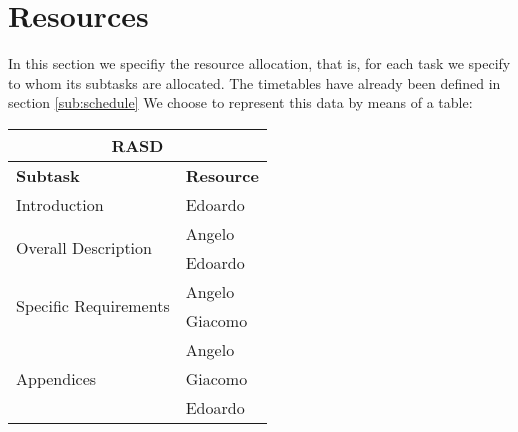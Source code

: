 \section{Resources} %
\label{sec:resources}

In this section we specifiy the resource allocation, that is, for each task we specify to whom its subtasks are allocated. The timetables have already been defined in section \ref{sub:schedule}
We choose to represent this data by means of a table:

\begin{center}
\begin{tabular}{ l|l }
	\multicolumn{2}{c}{\textbf{RASD}} \\ \hline
	\textbf{Subtask} & \textbf{Resource} \\ \hline
	\multirow{1}{*}{Introduction} & Edoardo \\ \hline
	\multirow{2}{*}{Overall Description} & Angelo \\
										 & Edoardo \\ \hline
	\multirow{2}{*}{Specific Requirements} & Angelo \\
										& Giacomo \\ \hline
	\multirow{3}{*}{Appendices} & Angelo \\ 
				& Giacomo \\
				& Edoardo \\ \hline
				
\end{tabular}
\end{center}

